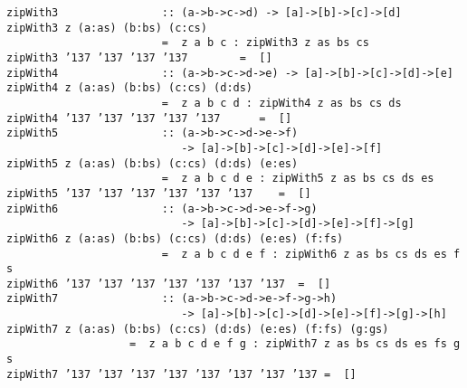 %
\eprogB\noindent\bprogB
\mbox{\tt zipWith3\ \ \ \ \ \ \ \ \ \ \ \ \ \ \ \ ::\ (a->b->c->d)\ ->\ [a]->[b]->[c]->[d]}\\
\mbox{\tt zipWith3\ z\ (a:as)\ (b:bs)\ (c:cs)}\\
\mbox{\tt \ \ \ \ \ \ \ \ \ \ \ \ \ \ \ \ \ \ \ \ \ \ \ \ =\ \ z\ a\ b\ c\ :\ zipWith3\ z\ as\ bs\ cs}\\
\mbox{\tt zipWith3\ {\char'137}\ {\char'137}\ {\char'137}\ {\char'137}\ \ \ \ \ \ \ \ =\ \ []}
%
\eprogB\noindent\bprogB
\mbox{\tt zipWith4\ \ \ \ \ \ \ \ \ \ \ \ \ \ \ \ ::\ (a->b->c->d->e)\ ->\ [a]->[b]->[c]->[d]->[e]}\\
\mbox{\tt zipWith4\ z\ (a:as)\ (b:bs)\ (c:cs)\ (d:ds)}\\
\mbox{\tt \ \ \ \ \ \ \ \ \ \ \ \ \ \ \ \ \ \ \ \ \ \ \ \ =\ \ z\ a\ b\ c\ d\ :\ zipWith4\ z\ as\ bs\ cs\ ds}\\
\mbox{\tt zipWith4\ {\char'137}\ {\char'137}\ {\char'137}\ {\char'137}\ {\char'137}\ \ \ \ \ \ =\ \ []}
%
\eprogB\noindent\bprogB
\mbox{\tt zipWith5\ \ \ \ \ \ \ \ \ \ \ \ \ \ \ \ ::\ (a->b->c->d->e->f)}\\
\mbox{\tt \ \ \ \ \ \ \ \ \ \ \ \ \ \ \ \ \ \ \ \ \ \ \ \ \ \ \ ->\ [a]->[b]->[c]->[d]->[e]->[f]}\\
\mbox{\tt zipWith5\ z\ (a:as)\ (b:bs)\ (c:cs)\ (d:ds)\ (e:es)}\\
\mbox{\tt \ \ \ \ \ \ \ \ \ \ \ \ \ \ \ \ \ \ \ \ \ \ \ \ =\ \ z\ a\ b\ c\ d\ e\ :\ zipWith5\ z\ as\ bs\ cs\ ds\ es}\\
\mbox{\tt zipWith5\ {\char'137}\ {\char'137}\ {\char'137}\ {\char'137}\ {\char'137}\ {\char'137}\ \ \ \ =\ \ []}
%
\eprogB\noindent\bprogB
\mbox{\tt zipWith6\ \ \ \ \ \ \ \ \ \ \ \ \ \ \ \ ::\ (a->b->c->d->e->f->g)}\\
\mbox{\tt \ \ \ \ \ \ \ \ \ \ \ \ \ \ \ \ \ \ \ \ \ \ \ \ \ \ \ ->\ [a]->[b]->[c]->[d]->[e]->[f]->[g]}\\
\mbox{\tt zipWith6\ z\ (a:as)\ (b:bs)\ (c:cs)\ (d:ds)\ (e:es)\ (f:fs)}\\
\mbox{\tt \ \ \ \ \ \ \ \ \ \ \ \ \ \ \ \ \ \ \ \ \ \ \ \ =\ \ z\ a\ b\ c\ d\ e\ f\ :\ zipWith6\ z\ as\ bs\ cs\ ds\ es\ fs}\\
\mbox{\tt zipWith6\ {\char'137}\ {\char'137}\ {\char'137}\ {\char'137}\ {\char'137}\ {\char'137}\ {\char'137}\ \ =\ \ []}
%
\eprogB\noindent\bprogB
\mbox{\tt zipWith7\ \ \ \ \ \ \ \ \ \ \ \ \ \ \ \ ::\ (a->b->c->d->e->f->g->h)}\\
\mbox{\tt \ \ \ \ \ \ \ \ \ \ \ \ \ \ \ \ \ \ \ \ \ \ \ \ \ \ \ ->\ [a]->[b]->[c]->[d]->[e]->[f]->[g]->[h]}\\
\mbox{\tt zipWith7\ z\ (a:as)\ (b:bs)\ (c:cs)\ (d:ds)\ (e:es)\ (f:fs)\ (g:gs)}\\
\mbox{\tt \ \ \ \ \ \ \ \ \ \ \ \ \ \ \ \ \ \ \ =\ \ z\ a\ b\ c\ d\ e\ f\ g\ :\ zipWith7\ z\ as\ bs\ cs\ ds\ es\ fs\ gs}\\
\mbox{\tt zipWith7\ {\char'137}\ {\char'137}\ {\char'137}\ {\char'137}\ {\char'137}\ {\char'137}\ {\char'137}\ {\char'137}\ =\ \ []}
%
\eprogB
